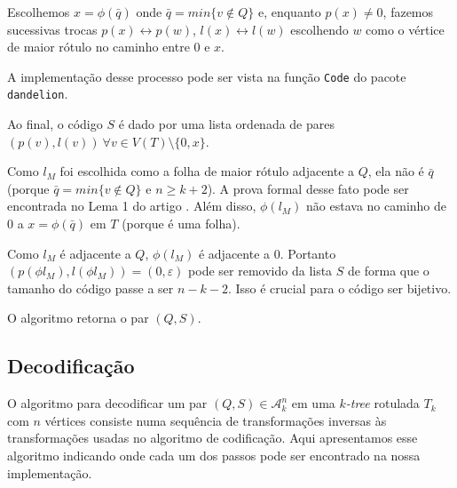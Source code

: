 \begin{algorithm}
\begin{step}
    Escolhemos $x = \phi(\bar{q})$ onde $\bar{q} = min\{v \not \in Q\}$ e, enquanto $p(x) \neq 0$, fazemos sucessivas trocas $p(x) \leftrightarrow p(w)$, $l(x) \leftrightarrow l(w)$ escolhendo $w$ como o vértice de maior rótulo no caminho entre $0$ e $x$.

    A implementação desse processo pode ser vista na função {\tt Code} do pacote {\tt dandelion}.

    Ao final, o código $S$ é dado por uma lista ordenada de pares $(p(v), l(v)) \  \forall v \in V(T) \setminus \{0, x\}$.
  \end{step}

  \begin{step}
    Como $l_M$ foi escolhida como a folha de maior rótulo adjacente a $Q$, ela não é $\bar{q}$ (porque $\bar{q} = min\{v \not \in Q\}$ e $n \geq k + 2$). A prova formal desse fato pode ser encontrada no Lema 1 do artigo \cite{caminiti}. Além disso, $\phi(l_M)$ não estava no caminho de $0$ a $x = \phi(\bar{q})$ em $T$ (porque é uma folha).

    Como $l_M$ é adjacente a $Q$, $\phi(l_M)$ é adjacente a $0$. Portanto $(p(\phi{l_M}), l(\phi{l_M})) = (0, \varepsilon)$ pode ser removido da lista $S$ de forma que o tamanho do código passe a ser $n - k - 2$. Isso é crucial para o código ser bijetivo.

    O algoritmo retorna o par $(Q, S)$.
  \end{step}
\end{algorithm}

\subsection{Decodificação}

O algoritmo para decodificar um par $(Q, S) \in \mathcal{A}^n_k$ em uma \emph{$k$-tree} rotulada $T_k$ com $n$ vértices consiste numa sequência de transformações inversas às transformações usadas no algoritmo de codificação. Aqui apresentamos esse algoritmo indicando onde cada um dos passos pode ser encontrado na nossa implementação.


